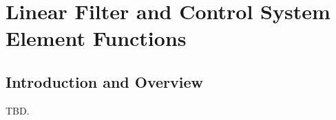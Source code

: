 \chapter{Linear Filter and Control System Element Functions}
\label{clfi0}

\section{Introduction and Overview}
\label{clfi0:siov0}

TBD.


